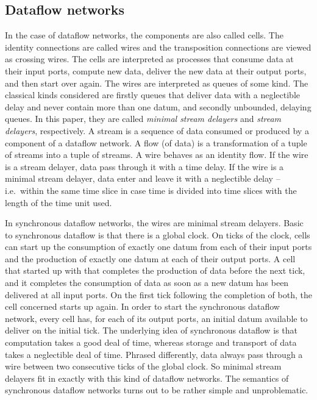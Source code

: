 \documentclass[fleqn]{llncs}
\begin{document}
\subsection{Dataflow networks}
In the case of dataflow networks, the components are also called cells.
The identity connections are called wires and the transposition
connections are viewed as crossing wires.
The cells are interpreted as processes that consume data at their input
ports, compute new data, deliver the new data at their output ports,
and then start over again.
The wires are interpreted as queues of some kind.
The classical kinds considered are firstly queues that deliver data with
a neglectible delay and never contain more than one datum, and secondly
unbounded, delaying queues.
In this paper, they are called {\em minimal stream delayers\/} and
{\em stream delayers}, respectively.
A stream is a sequence of data consumed or produced by a component of a
dataflow network.
A flow (of data) is a transformation of a tuple of streams into a tuple
of streams.
A wire behaves as an identity flow.
If the wire is a stream delayer, data pass through it with a time delay.
If the wire is a minimal stream delayer, data enter and leave it with a
neglectible delay -- i.e.\ within the same time slice in case time is
divided into time slices with the length of the time unit used.

In synchronous dataflow networks, the wires are minimal stream delayers.
Basic to synchronous dataflow is that there is a global clock.
On ticks of the clock, cells can start up the consumption of exactly
one datum from each of their input ports and the production of exactly
one datum at each of their output ports.
A cell that started up with that completes the production of data before
the next tick, and it completes the consumption of data as soon as a
new datum has been delivered at all input ports.
On the first tick following the completion of both, the cell concerned
starts up again.
In order to start the synchronous dataflow network, every cell has, for
each of its output ports, an initial datum available to deliver on the
initial tick.
The underlying idea of synchronous dataflow is that computation takes a
good deal of time, whereas storage and transport of data takes a
neglectible deal of time.
Phrased differently, data always pass through a wire between two
consecutive ticks of the global clock.
So minimal stream delayers fit in exactly with this kind of dataflow
networks.
The semantics of synchronous dataflow networks turns out to be rather
simple and unproblematic.
\end{document}
